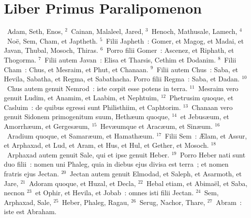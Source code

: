 {\centering \section*{Liber Primus Paralipomenon}}\thispagestyle{empty}

~\lettrine[lines=10,image=true,loversize=0.05,lraise=-0.03]{A}{}dam, Seth, Enos,
${}^{2}$~Cainan, Malaleel, Jared,
${}^{3}$~Henoch, Mathusale, Lamech,
${}^{4}$~No\"e, Sem, Cham, et Japtheth.
${}^{5}$~Filii Japheth~: Gomer, et Magog, et Madai, et Javan, Thubal, Mosoch, Thiras.
${}^{6}$~Porro filii Gomer~: Ascenez, et Riphath, et Thogorma.
${}^{7}$~Filii autem Javan~: Elisa et Tharsis, Cethim et Dodanim.
${}^{8}$~Filii Cham~: Chus, et Mesraim, et Phut, et Chanaan.
${}^{9}$~Filii autem Chus~: Saba, et Hevila, Sabatha, et Regma, et Sabathacha. Porro filii Regma~: Saba, et Dadan.
${}^{10}$~Chus autem genuit Nemrod~: iste cœpit esse potens in terra.
${}^{11}$~Mesraim vero genuit Ludim, et Anamim, et Laabim, et Nephtuim,
${}^{12}$~Phetrusim quoque, et Casluim~: de quibus egressi sunt Philisthiim, et Caphtorim.
${}^{13}$~Chanaan vero genuit Sidonem primogenitum suum, Heth\ae um quoque,
${}^{14}$~et Jebus\ae um, et Amorrh\ae um, et Gerges\ae um,
${}^{15}$~Hev\ae umque et Arac\ae um, et Sin\ae um.
${}^{16}$~Aradium quoque, et Samar\ae um, et Hamath\ae um.
${}^{17}$~Filii Sem~: \AE lam, et Assur, et Arphaxad, et Lud, et Aram, et Hus, et Hul, et Gether, et Mosoch.
${}^{18}$~Arphaxad autem genuit Sale, qui et ipse genuit Heber.
${}^{19}$~Porro Heber nati sunt duo filii~: nomen uni Phaleg, quia in diebus ejus divisa est terra~; et nomen fratris ejus Jectan.
${}^{20}$~Jectan autem genuit Elmodad, et Saleph, et Asarmoth, et Jare,
${}^{21}$~Adoram quoque, et Huzal, et Decla,
${}^{22}$~Hebal etiam, et Abima\"el, et Saba, necnon
${}^{23}$~et Ophir, et Hevila, et Jobab~: omnes isti filii Jectan.
${}^{24}$~Sem, Arphaxad, Sale,
${}^{25}$~Heber, Phaleg, Ragau,
${}^{26}$~Serug, Nachor, Thare,
${}^{27}$~Abram~: iste est Abraham.


